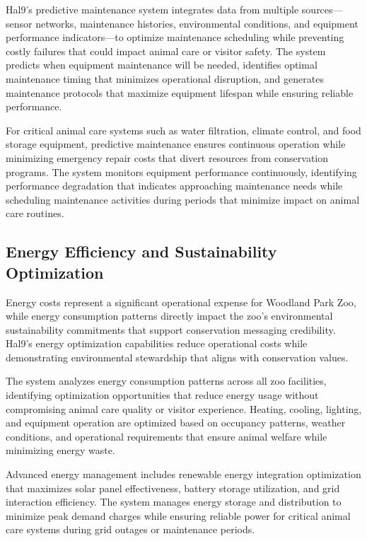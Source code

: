\documentclass[
  Letterpaper,
]{scrbook}
\begin{document}
Hal9's predictive maintenance system integrates data from multiple
sources---sensor networks, maintenance histories, environmental
conditions, and equipment performance indicators---to optimize
maintenance scheduling while preventing costly failures that could
impact animal care or visitor safety. The system predicts when equipment
maintenance will be needed, identifies optimal maintenance timing that
minimizes operational disruption, and generates maintenance protocols
that maximize equipment lifespan while ensuring reliable performance.

For critical animal care systems such as water filtration, climate
control, and food storage equipment, predictive maintenance ensures
continuous operation while minimizing emergency repair costs that divert
resources from conservation programs. The system monitors equipment
performance continuously, identifying performance degradation that
indicates approaching maintenance needs while scheduling maintenance
activities during periods that minimize impact on animal care routines.

\subsection{Energy Efficiency and Sustainability
Optimization}\label{energy-efficiency-and-sustainability-optimization}

Energy costs represent a significant operational expense for Woodland
Park Zoo, while energy consumption patterns directly impact the zoo's
environmental sustainability commitments that support conservation
messaging credibility. Hal9's energy optimization capabilities reduce
operational costs while demonstrating environmental stewardship that
aligns with conservation values.

The system analyzes energy consumption patterns across all zoo
facilities, identifying optimization opportunities that reduce energy
usage without compromising animal care quality or visitor experience.
Heating, cooling, lighting, and equipment operation are optimized based
on occupancy patterns, weather conditions, and operational requirements
that ensure animal welfare while minimizing energy waste.

Advanced energy management includes renewable energy integration
optimization that maximizes solar panel effectiveness, battery storage
utilization, and grid interaction efficiency. The system manages energy
storage and distribution to minimize peak demand charges while ensuring
reliable power for critical animal care systems during grid outages or
maintenance periods.
\end{document}
